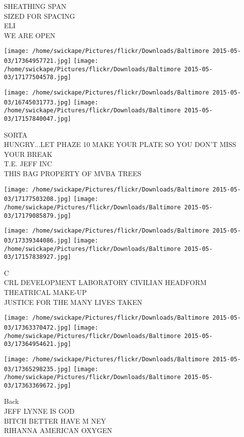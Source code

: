 \documentclass[10pt,letterpaper]{article}
\begin{document}
SHEATHING SPAN\\
SIZED FOR SPACING\\
ELI\\
WE ARE OPEN\\
\pagebreak

\texttt{[image: /home/swickape/Pictures/flickr/Downloads/Baltimore 2015-05-03/17364957721.jpg]}
\texttt{[image: /home/swickape/Pictures/flickr/Downloads/Baltimore 2015-05-03/17177504578.jpg]}

\texttt{[image: /home/swickape/Pictures/flickr/Downloads/Baltimore 2015-05-03/16745031773.jpg]}
\texttt{[image: /home/swickape/Pictures/flickr/Downloads/Baltimore 2015-05-03/17157840047.jpg]}

SORTA\\
HUNGRY...LET PHAZE 10 MAKE YOUR PLATE SO YOU DON'T MISS YOUR BREAK\\
T.E. JEFF INC\\
THIS BAG PROPERTY OF MVBA TREES\\
\pagebreak

\texttt{[image: /home/swickape/Pictures/flickr/Downloads/Baltimore 2015-05-03/17177503208.jpg]}
\texttt{[image: /home/swickape/Pictures/flickr/Downloads/Baltimore 2015-05-03/17179085879.jpg]}

\texttt{[image: /home/swickape/Pictures/flickr/Downloads/Baltimore 2015-05-03/17339344086.jpg]}
\texttt{[image: /home/swickape/Pictures/flickr/Downloads/Baltimore 2015-05-03/17157838927.jpg]}

C\\
CRL DEVELOPMENT LABORATORY CIVILIAN HEADFORM\\
THEATRICAL MAKE{-}UP\\
JUSTICE FOR THE MANY LIVES TAKEN\\
\pagebreak

\texttt{[image: /home/swickape/Pictures/flickr/Downloads/Baltimore 2015-05-03/17363370472.jpg]}
\texttt{[image: /home/swickape/Pictures/flickr/Downloads/Baltimore 2015-05-03/17364954621.jpg]}

\texttt{[image: /home/swickape/Pictures/flickr/Downloads/Baltimore 2015-05-03/17365298235.jpg]}
\texttt{[image: /home/swickape/Pictures/flickr/Downloads/Baltimore 2015-05-03/17363369672.jpg]}

Back\\
JEFF LYNNE IS GOD\\
BITCH BETTER HAVE M NEY\\
RIHANNA AMERICAN OXYGEN\\
\pagebreak
\end{document}
